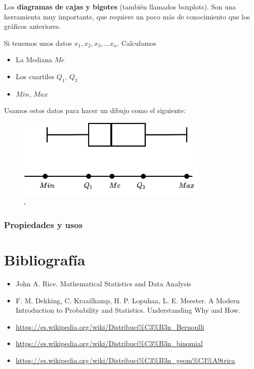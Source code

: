 \documentclass[]{article}
\providecommand{\tightlist}{%
  \setlength{\itemsep}{0pt}\setlength{\parskip}{0pt}}
\theoremstyle{plain}
\theoremstyle{definition}
\theoremstyle{definition} %
\begin{document}
Los \textbf{diagramas de cajas y bigotes} (también llamados boxplots).
Son una herramienta muy importante, que requiere un poco más de
conocimiento que los gráficos anteriores.

Si tenemos unos datos \(x_1, x_2, x_3,\ldots x_n\). Calculamos

\begin{itemize}
\tightlist
\item
  La Mediana \(Me\)
\item
  Los cuartiles \(Q_1\), \(Q_3\)
\item
  \(Min\), \(Max\)
\end{itemize}

Usamos estos datos para hacer un dibujo como el siguiente:

\begin{figure}
\centering
\includegraphics[width=3.64583in,height=\textheight]{img/boxplot.png}
\caption{-}
\end{figure}

\hypertarget{propiedades-y-usos-2}{%
\subsubsection{Propiedades y usos}\label{propiedades-y-usos-2}}

\hypertarget{bibliografuxeda}{%
\section{Bibliografía}\label{bibliografuxeda}}

\begin{itemize}
\tightlist
\item
  John A. Rice. Mathematical Statistics and Data Analysis
\item
  F. M. Dekking, C. Kraailkamp, H. P. Lopuhaa, L. E. Meester. A Modern
  Introduction to Probability and Statistics. Understanding Why and How.
\item
  \url{https://es.wikipedia.org/wiki/Distribuci\%C3\%B3n_Bernoulli}
\item
  \url{https://es.wikipedia.org/wiki/Distribuci\%C3\%B3n_binomial}
\item
  \url{https://es.wikipedia.org/wiki/Distribuci\%C3\%B3n_geom\%C3\%A9trica}
\end{itemize}
\end{document}
